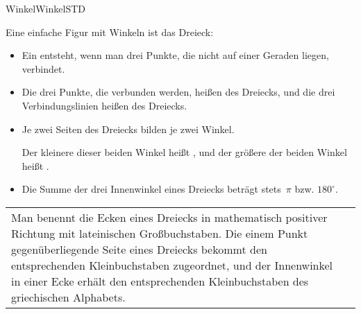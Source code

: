 \begin{MXContent}{Winkel}{Winkel}{STD}
\begin{MInfo}
\end{MInfo}

Eine einfache Figur mit Winkeln ist das Dreieck:
\begin{MInfo}%
\begin{itemize}
 \item Ein  entsteht,
       wenn man drei Punkte, die nicht auf einer Geraden liegen, verbindet.
       
 \item Die drei Punkte, die verbunden werden, hei\ss en
        des Dreiecks, und
       die drei Verbindungslinien hei\ss en
        des Dreiecks.
       
 \item Je zwei Seiten des Dreiecks bilden je zwei Winkel.
   
       Der kleinere dieser beiden Winkel hei\ss t
       ,
       und der gr\"o\ss ere der beiden Winkel hei\ss t
       .
 
 \item Die Summe der drei Innenwinkel eines Dreiecks betr\"agt stets~$\pi$ bzw. $180^\circ$.
\end{itemize}
\end{MInfo}

\begin{tabular}{lr}
\begin{minipage}{10cm}
Man benennt die Ecken eines Dreiecks in mathematisch positiver Richtung mit lateinischen Gro\ss buchstaben. Die einem Punkt gegen\"uberliegende
Seite eines Dreiecks bekommt den entsprechenden Kleinbuchstaben zugeordnet, und
der Innenwinkel in einer Ecke erh\"alt den entsprechenden Kleinbuchstaben des
griechischen Alphabets.


\end{minipage}
\end{tabular}
\end{MXContent}
